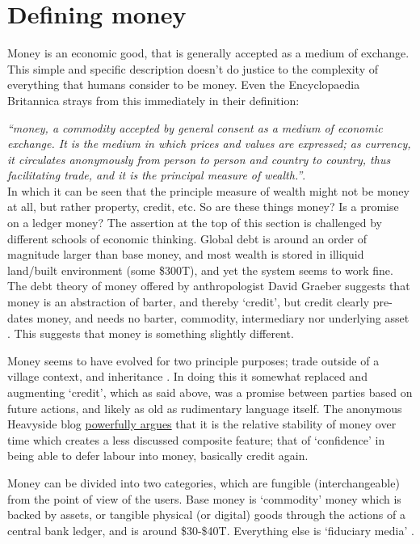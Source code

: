 \section{Defining money}
Money is an economic good, that is generally accepted as a medium of exchange. This simple and specific description doesn't do justice to the complexity of everything that humans consider to be money. Even the Encyclopaedia Britannica strays from this immediately in their definition:\par
\textit{``money, a commodity accepted by general consent as a medium of economic exchange. It is the medium in which prices and values are expressed; as currency, it circulates anonymously from person to person and country to country, thus facilitating trade, and it is the principal measure of wealth.''}. \\
In which it can be seen that the principle measure of wealth might not be money at all, but rather property, credit, etc. So are these things money? Is a promise on a ledger money? The assertion at the top of this section is challenged by different schools of economic thinking. Global debt is around an order of magnitude larger than base money, and most wealth is stored in illiquid land/built environment (some \$300T), and yet the system seems to work fine. The debt theory of money offered by anthropologist David Graeber suggests that money is an abstraction of barter, and thereby `credit', but credit clearly pre-dates money, and needs no barter, commodity, intermediary nor underlying asset \cite{homer1996history}. This suggests that money is something slightly different.\par
Money seems to have evolved for two principle purposes; trade outside of a village context, and inheritance \cite{szabo2002shelling}. In doing this it somewhat replaced and augmenting `credit', which as said above, was a promise between parties based on future actions, and likely as old as rudimentary language itself. The anonymous Heavyside blog \href{https://heaviside.substack.com/p/the-forgotten-fourth-function-of}{powerfully argues} that it is the relative stability of money over time which creates a less discussed composite feature; that of `confidence' in being able to defer labour into money, basically credit again.\par
Money can be divided into two categories, which are fungible (interchangeable) from the point of view of the users. Base money is `commodity' money which is backed by assets, or tangible physical (or digital) goods through the actions of a central bank ledger, and is around \$30-\$40T. Everything else is `fiduciary media' \cite{selgin1996defense}.\par
